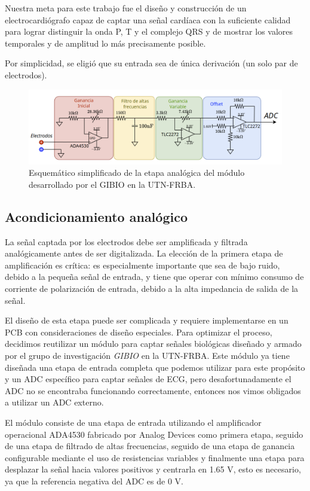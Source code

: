 \documentclass[conference]{IEEEtran}
\begin{document}
Nuestra meta para este trabajo fue el diseño y construcción de un electrocardiógrafo
capaz de captar una señal cardíaca con la suficiente calidad para lograr distinguir
la onda P, T y el complejo QRS y de mostrar los valores temporales y de amplitud
lo más precisamente posible.

Por simplicidad, se eligió que su entrada sea de única derivación (un solo par de
electrodos).
\begin{figure}[b]
    \centering
    \includegraphics[width=\textwidth]{figs/etapa_analogica.png}
    \caption{Esquemático simplificado de la etapa analógica del módulo desarrollado 
    por el GIBIO en la UTN-FRBA.}
    \label{fig:etapa_analogica_esquematico}
  \end{figure}
\subsection{Acondicionamiento analógico}




La señal captada por los electrodos debe ser amplificada y filtrada analógicamente
antes de ser digitalizada. La elección de la primera etapa de amplificación es
crítica: es especialmente importante que sea de bajo ruido, debido a la pequeña
señal de entrada, y tiene que operar con mínimo consumo de corriente de polarización
de entrada, debido a la alta impedancia de salida de la señal.

El diseño de esta etapa puede ser complicada y requiere implementarse en un PCB 
con consideraciones de diseño especiales. Para optimizar el proceso, decidimos
reutilizar un módulo para captar señales biológicas diseñado y armado por el grupo
de investigación \textit{GIBIO} en la UTN-FRBA. Este módulo ya tiene diseñada una
etapa de entrada completa que podemos utilizar para este propósito y un ADC
específico para captar señales de ECG, pero desafortunadamente el ADC no se encontraba
funcionando correctamente, entonces nos vimos obligados a utilizar un ADC externo.

El módulo consiste de una etapa de entrada utilizando el amplificador operacional
ADA4530 fabricado por Analog Devices como primera etapa, seguido de una etapa de
filtrado de altas frecuencias, seguido de una etapa de ganancia configurable mediante
el uso de resistencias variables y finalmente una etapa para desplazar la señal hacia
valores positivos y centrarla en 1.65 V, esto es necesario, ya que la referencia
negativa del ADC es de 0 V.
\end{document}
